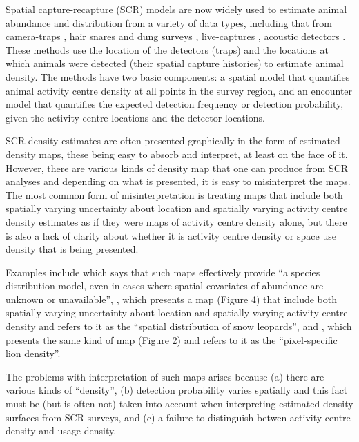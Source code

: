 \documentclass[10pt,a4paper]{article}
\begin{document}
Spatial capture-recapture (SCR) models \citep*{Efford:04,Borchers+Efford:08, Royle+Young:08} are now widely used to estimate animal abundance and distribution from a variety of data types, including that from camera-traps \citep[][for example]{}, hair snares and dung surveys \citep[][for example]{}, live-captures \citep[][for example]{}, acoustic detectors \citep[][for example]{Dawson+Efford:09,Kidney+al:13,Stevenson+al:15,Borchers+al:15,Loveridge+al:17}. These methods use the location of the detectors (traps) and the locations at which animals were detected (their spatial capture histories) to estimate animal density. The methods have two basic components: a spatial model that quantifies animal activity centre density at all points in the survey region, and an encounter model that quantifies the expected detection frequency or detection probability, given the activity centre locations and the detector locations. 

SCR density estimates are often presented graphically in the form of estimated density maps, these being easy to absorb and interpret, at least on the face of it.  However, there are various kinds of density map that one can produce from SCR analyses and depending on what is presented, it is easy to misinterpret the maps. The most common form of misinterpretation is treating maps that include both spatially varying uncertainty about location and spatially varying activity centre density estimates as if they were maps of activity centre density alone, but there is also a lack of clarity about whether it is activity centre density or space use density that is being presented.

Examples include \cite{Dorzaio+Karanth:17} which says that such maps effectively provide  ``a species distribution model, even in cases where spatial covariates of abundance are unknown or unavailable'', \cite{Alexander+al:15}, which presents a map (Figure 4) that include both spatially varying uncertainty about location and spatially varying activity centre density and refers to it as the ``spatial distribution of snow leopards'', and \cite{Elliot+Gopalaswamy:16}, which presents the same kind of map (Figure 2) and refers to it as the ``pixel-specific lion density''. 

The problems with interpretation of such maps arises because (a) there are various kinds of ``density'', (b) detection probability varies spatially and this fact must be (but is often not) taken into account when interpreting estimated density surfaces from SCR surveys, and (c) a failure to distinguish betwen activity centre density and usage density. 
\end{document}
